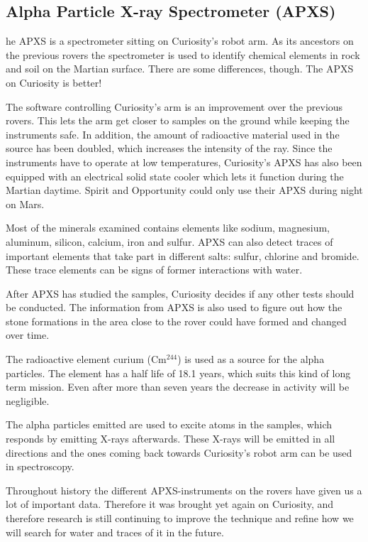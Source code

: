 \subsection{Alpha Particle X-ray Spectrometer (APXS)}
he APXS is a spectrometer sitting on Curiosity's robot arm.
As its ancestors on the previous rovers the spectrometer is used to identify chemical elements in rock and soil on the Martian surface.
There are some differences, though.
The APXS on Curiosity is better!

The software controlling Curiosity's arm is an improvement over the previous rovers.
This lets the arm get closer to samples on the ground while keeping the instruments safe.
In addition, the amount of radioactive material used in the source has been doubled, which increases the intensity of the ray.
Since the instruments have to operate at low temperatures, Curiosity's APXS has also been equipped with an electrical solid state cooler which lets it function during the Martian daytime.
Spirit and Opportunity could only use their APXS during night on Mars.

Most of the minerals examined contains elements like sodium, magnesium, aluminum, silicon, calcium, iron and sulfur.
APXS can also detect traces of important elements that take part in different salts: sulfur, chlorine and bromide.
These trace elements can be signs of former interactions with water.

After APXS has studied the samples, Curiosity decides if any other tests should be conducted.
The information from APXS is also used to figure out how the stone formations in the area close to the rover could have formed and changed over time.

The radioactive element curium (Cm$^{244}$) is used as a source for the alpha particles.
The element has a half life of 18.1 years, which suits this kind of long term mission.
Even after more than seven years the decrease in activity will be negligible.

The alpha particles emitted are used to excite atoms in the samples, which responds by emitting X-rays afterwards.
These X-rays will be emitted in all directions and the ones coming back towards Curiosity's robot arm can be used in spectroscopy.

Throughout history the different APXS-instruments on the rovers have given us a lot of important data.
Therefore it was brought yet again on Curiosity, and therefore research is still continuing to improve the technique and refine how we will search for water and traces of it in the future.